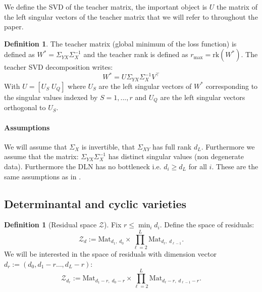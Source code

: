 \documentclass{article}
\theoremstyle{definition}
\newtheorem{definition}[theorem]{Definition}
\begin{document}
We define the SVD of the teacher matrix, the important object is $U$ the matrix of the left singular vectors of the teacher matrix that we will refer to throughout the paper.
\begin{definition}\label{def:teacher-matrix}
    The teacher matrix (global minimum of the loss function) is defined as $W^* = \Sigma_{YX}\Sigma_X^{-1}$ and the teacher rank is defined as $r_{\max} = \text{rk}(W^*)$. The teacher SVD decomposition writes:
    \begin{equation*}
        W^* = U \Sigma_{YX}\Sigma_X^{-1} V^\top
    \end{equation*}
    With $U = [U_S\; U_Q]$ where $U_S$ are the left singular vectors of $W^*$ corresponding to the singular values indexed by $S={1,...,r}$ and $U_Q$ are the left singular vectors orthogonal to $U_S$. 
\end{definition}
\paragraph{Assumptions} We will assume that $\Sigma_X$ is invertible, that $\Sigma_{XY}$ has full rank $d_L$. Furthermore we assume that the matrix: $\Sigma_{YX}\Sigma_X^{-1}$ has distinct singular values (non degenerate data). Furthermore the DLN has no bottleneck i.e. $d_i \geq d_L$ for all $i$. These are the same assumptions as in \cite{achour2024loss}. 
\subsection{Determinantal and cyclic varieties}
\begin{definition}[Residual space $\mathcal Z$]
Fix $r \le \min_i d_i$. Define the space of residuals:
\[
\mathcal Z_{d}
:=
\mathrm{Mat}_{d_1 ,\; d_0}
\times
\prod_{\ell=2}^{L   }
\mathrm{Mat}_{d_\ell ,\; d_{\ell-1} }.
\]
We will be interested in the space of residuals with dimension vector $d_r:=(d_0, d_1-r\dots,d_L-r)$:
\[
\mathcal Z_{d_r}
:=
\mathrm{Mat}_{d_1-r ,\; d_0-r}
\times
\prod_{\ell=2}^{L   }\mathrm{Mat}_{d_\ell-r ,\; d_{\ell-1}-r }.
\]
\end{definition}
\end{document}
